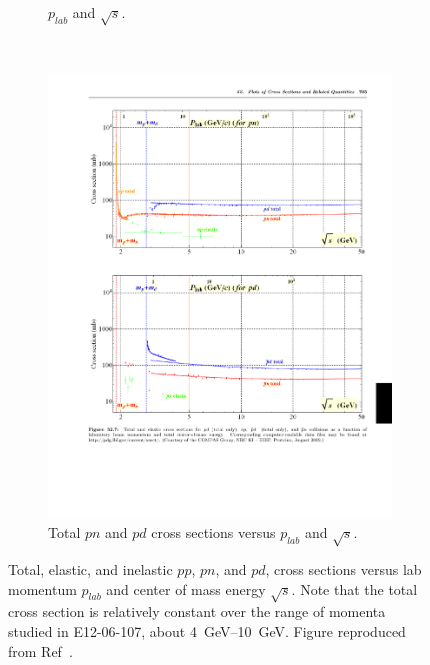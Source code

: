 \begin{figure}[!h]
\begin{subfigure}[b]{1.0\textwidth}
{                 $p_{lab}$ and $\sqrt{s}$.
                }
        \label{fig:pdg_pp_cross_section}
    \end{subfigure}
    \vspace{0.1cm}
    \\
    \begin{subfigure}[b]{1.0\textwidth}
        \centering
        \includegraphics[width=1.0\textwidth]{chap2/pdg_pn_cross_section.pdf}
        \caption[Total $pn$ and $pd$ cross sections versus
                 $p_{lab}$ and $\sqrt{s}$.]{
                 Total $pn$ and $pd$ cross sections versus
                 $p_{lab}$ and $\sqrt{s}$.
                }
        \label{fig:pdg_pn_cross_section}
    \end{subfigure}
    \caption[Total, elastic, and inelastic $pp$, $pn$, and $pd$, cross sections
             versus lab momentum $p_{lab}$ and center of mass energy $\sqrt{s}$.]{
             Total, elastic, and inelastic $pp$, $pn$, and $pd$, cross sections
             versus lab momentum $p_{lab}$ and center of mass energy $\sqrt{s}$.
             Note that the total cross section is relatively constant over
             the range of momenta studied in E12-06-107, about
             \SIrange{4}{10}{\giga\electronvolt}.
             Figure reproduced from Ref~\cite{pdg_2020}.
             }
    \label{fig:pdg_nucleon_nucleon_cross_section}
\end{figure}


